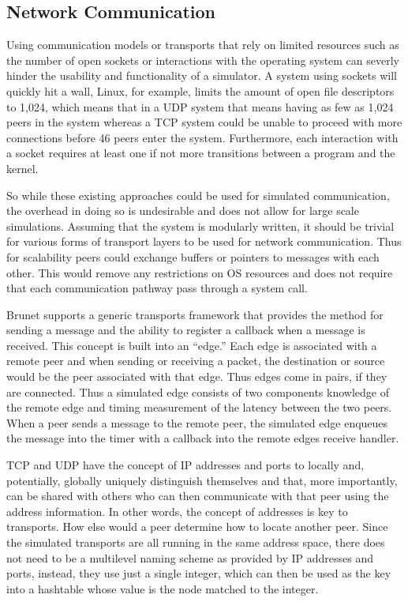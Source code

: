 \subsection{Network Communication}
\label{ap2p:nc}

Using communication models or transports that rely on limited resources such as
the number of open sockets or interactions with the operating system can
severly hinder the usability and functionality of a simulator.  A system using
sockets will quickly hit a wall, Linux, for example, limits the amount of open
file descriptors to 1,024, which means that in a UDP system that means having
as few as 1,024 peers in the system whereas a TCP system could be unable to
proceed with more connections before 46 peers enter the system.  Furthermore,
each interaction with a socket requires at least one if not more transitions
between a program and the kernel.

So while these existing approaches could be used for simulated communication,
the overhead in doing so is undesirable and does not allow for large scale
simulations.  Assuming that the system is modularly written, it should be
trivial for various forms of transport layers to be used for network
communication.  Thus for scalability peers could exchange buffers or pointers
to messages with each other.  This would remove any restrictions on OS
resources and does not require that each communication pathway pass through a
system call.

Brunet supports a generic transports framework that provides the method for
sending a message and the ability to register a callback when a message is
received.  This concept is built into an ``edge.''  Each edge is associated
with a remote peer and when sending or receiving a packet, the destination or
source would be the peer associated with that edge.  Thus edges come in pairs,
if they are connected.  Thus a simulated edge consists of two components
knowledge of the remote edge and timing measurement of the latency between the
two peers.  When a peer sends a message to the remote peer, the simulated edge
enqueues the message into the timer with a callback into the remote edges
receive handler.

TCP and UDP have the concept of IP addresses and ports to locally and,
potentially, globally uniquely distinguish themselves and that, more
importantly, can be shared with others who can then communicate with that peer
using the address information.  In other words, the concept of addresses is key
to transports.  How else would a peer determine how to locate another peer.
Since the simulated transports are all running in the same address space, there
does not need to be a multilevel naming scheme as provided by IP addresses and
ports, instead, they use just a single integer, which can then be used as the
key into a hashtable whose value is the node matched to the integer.

